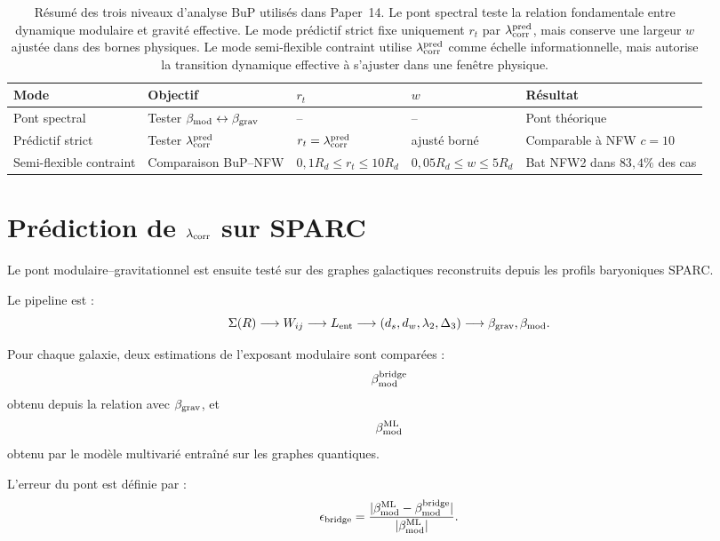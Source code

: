 \documentclass[11pt,a4paper]{article}
\begin{document}
\begin{table}[H]
\centering
\begin{tabular}{lllll}
\toprule
Mode & Objectif & \(r_t\) & \(w\) & Résultat \\
\midrule
Pont spectral
& Tester \(\beta_{\rm mod}\leftrightarrow\beta_{\rm grav}\)
& -- & -- & Pont théorique \\

Prédictif strict
& Tester \(\lambda_{\rm corr}^{\rm pred}\)
& \(r_t=\lambda_{\rm corr}^{\rm pred}\)
& ajusté borné
& Comparable à NFW \(c=10\) \\

Semi-flexible contraint
& Comparaison BuP--NFW
& \(0{,}1R_d\le r_t\le 10R_d\)
& \(0{,}05R_d\le w\le 5R_d\)
& Bat NFW2 dans \(83{,}4\%\) des cas \\
\bottomrule
\end{tabular}
\caption{
Résumé des trois niveaux d'analyse BuP utilisés dans Paper~14. Le pont
spectral teste la relation fondamentale entre dynamique modulaire et gravité
effective. Le mode prédictif strict fixe uniquement \(r_t\) par
\(\lambda_{\rm corr}^{\rm pred}\), mais conserve une largeur \(w\) ajustée
dans des bornes physiques. Le mode semi-flexible contraint utilise
\(\lambda_{\rm corr}^{\rm pred}\) comme échelle informationnelle, mais
autorise la transition dynamique effective à s'ajuster dans une fenêtre
physique.
}
\label{tab:modes}
\end{table}

\section{Prédiction de \(\lambda_{\rm corr}\) sur SPARC}

Le pont modulaire--gravitationnel est ensuite testé sur des graphes
galactiques reconstruits depuis les profils baryoniques SPARC.

Le pipeline est :
\[
\Sigma(R)
\longrightarrow
W_{ij}
\longrightarrow
L_{\rm ent}
\longrightarrow
(d_s,d_w,\lambda_2,\Delta_3)
\longrightarrow
\beta_{\rm grav},\beta_{\rm mod}.
\]

Pour chaque galaxie, deux estimations de l'exposant modulaire sont comparées :
\[
\beta_{\rm mod}^{\rm bridge}
\]
obtenu depuis la relation avec \(\beta_{\rm grav}\), et
\[
\beta_{\rm mod}^{\rm ML}
\]
obtenu par le modèle multivarié entraîné sur les graphes quantiques.

L'erreur du pont est définie par :
\[
\epsilon_{\rm bridge}
=
\frac{
|\beta_{\rm mod}^{\rm ML}
-
\beta_{\rm mod}^{\rm bridge}|
}{
|\beta_{\rm mod}^{\rm ML}|
}.
\]
\end{document}
